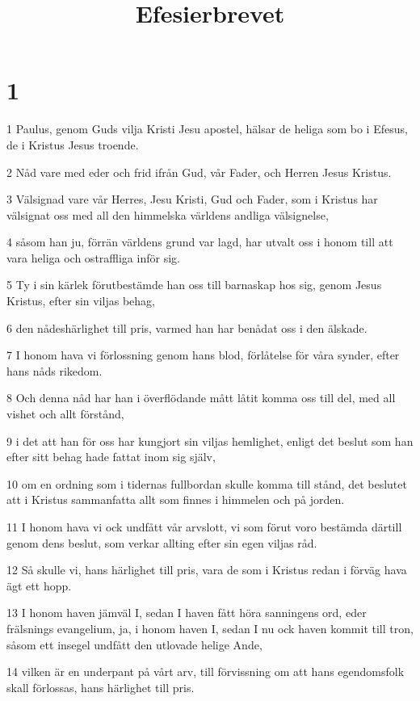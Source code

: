

\title{Efesierbrevet}


\chapter{1}

\par 1 Paulus, genom Guds vilja Kristi Jesu apostel, hälsar de heliga som bo i Efesus, de i Kristus Jesus troende.
\par 2 Nåd vare med eder och frid ifrån Gud, vår Fader, och Herren Jesus Kristus.
\par 3 Välsignad vare vår Herres, Jesu Kristi, Gud och Fader, som i Kristus har välsignat oss med all den himmelska världens andliga välsignelse,
\par 4 såsom han ju, förrän världens grund var lagd, har utvalt oss i honom till att vara heliga och ostraffliga inför sig.
\par 5 Ty i sin kärlek förutbestämde han oss till barnaskap hos sig, genom Jesus Kristus, efter sin viljas behag,
\par 6 den nådeshärlighet till pris, varmed han har benådat oss i den älskade.
\par 7 I honom hava vi förlossning genom hans blod, förlåtelse för våra synder, efter hans nåds rikedom.
\par 8 Och denna nåd har han i överflödande mått låtit komma oss till del, med all vishet och allt förstånd,
\par 9 i det att han för oss har kungjort sin viljas hemlighet, enligt det beslut som han efter sitt behag hade fattat inom sig själv,
\par 10 om en ordning som i tidernas fullbordan skulle komma till stånd, det beslutet att i Kristus sammanfatta allt som finnes i himmelen och på jorden.
\par 11 I honom hava vi ock undfått vår arvslott, vi som förut voro bestämda därtill genom dens beslut, som verkar allting efter sin egen viljas råd.
\par 12 Så skulle vi, hans härlighet till pris, vara de som i Kristus redan i förväg hava ägt ett hopp.
\par 13 I honom haven jämväl I, sedan I haven fått höra sanningens ord, eder frälsnings evangelium, ja, i honom haven I, sedan I nu ock haven kommit till tron, såsom ett insegel undfått den utlovade helige Ande,
\par 14 vilken är en underpant på vårt arv, till förvissning om att hans egendomsfolk skall förlossas, hans härlighet till pris.
